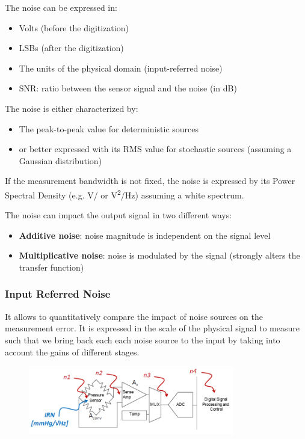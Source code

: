 The noise can be expressed in:
\begin{itemize}
    \item Volts (before the digitization)
    \item LSBs (after the digitization)
    \item The units of the physical domain (input-referred noise)
    \item SNR: ratio between the sensor signal and the noise (in dB)
\end{itemize}
The noise is either characterized by:
\begin{itemize}
    \item The peak-to-peak value for deterministic sources
    \item or better expressed with its RMS value for stochastic sources (assuming a Gaussian distribution)
\end{itemize}
If the measurement bandwidth is not fixed, the noise is expressed by its Power Spectral Density
(e.g. \si{V/} or \si{V^2/Hz}) assuming a white spectrum. 

The noise can impact the output signal in two different ways: 

\begin{itemize}
    \item \textbf{Additive noise}: noise magnitude is independent on the signal level
    \item \textbf{Multiplicative noise}: noise is modulated by the signal (strongly alters the transfer function)
\end{itemize}

\subsubsection{Input Referred Noise}

It allows to quantitatively compare the impact
of noise sources on the measurement error. It is expressed in the scale of the physical signal to
measure such that we bring back each each noise source to the input by taking into account the gains of different stages.

\begin{figure}[H]
    \centering
    \includegraphics[width = 0.8\textwidth]{L3/img/reffered-noise.PNG}
\end{figure}

